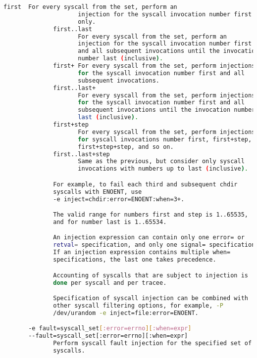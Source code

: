 {{\begin{lstlisting}[language=bash]
              first  For every syscall from the set, perform an
                     injection for the syscall invocation number first
                     only.
              first..last
                     For every syscall from the set, perform an
                     injection for the syscall invocation number first
                     and all subsequent invocations until the invocation
                     number last (inclusive).
              first+ For every syscall from the set, perform injections
                     for the syscall invocation number first and all
                     subsequent invocations.
              first..last+
                     For every syscall from the set, perform injections
                     for the syscall invocation number first and all
                     subsequent invocations until the invocation number
                     last (inclusive).
              first+step
                     For every syscall from the set, perform injections
                     for syscall invocations number first, first+step,
                     first+step+step, and so on.
              first..last+step
                     Same as the previous, but consider only syscall
                     invocations with numbers up to last (inclusive).

              For example, to fail each third and subsequent chdir
              syscalls with ENOENT, use
              -e inject=chdir:error=ENOENT:when=3+.

              The valid range for numbers first and step is 1..65535,
              and for number last is 1..65534.

              An injection expression can contain only one error= or
              retval= specification, and only one signal= specification.
              If an injection expression contains multiple when=
              specifications, the last one takes precedence.

              Accounting of syscalls that are subject to injection is
              done per syscall and per tracee.

              Specification of syscall injection can be combined with
              other syscall filtering options, for example, -P
              /dev/urandom -e inject=file:error=ENOENT.

       -e fault=syscall_set[:error=errno][:when=expr]
       --fault=syscall_set[:error=errno][:when=expr]
              Perform syscall fault injection for the specified set of
              syscalls.


\end{lstlisting}}}

